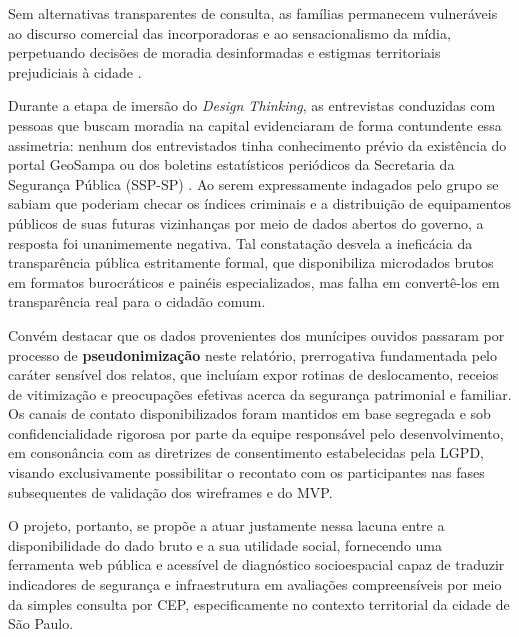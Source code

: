 \documentclass[
    12pt,
    oneside,            %
    a4paper,
    brazilian
    ]{abntex2}
\begin{document}
Sem alternativas transparentes de consulta, as famílias permanecem vulneráveis ao discurso comercial das incorporadoras e ao sensacionalismo da mídia, perpetuando decisões de moradia desinformadas e estigmas territoriais prejudiciais à cidade \cite{nev2024}.

Durante a etapa de imersão do \emph{Design Thinking}, as entrevistas conduzidas com pessoas que buscam moradia na capital evidenciaram de forma contundente essa assimetria: nenhum dos entrevistados tinha conhecimento prévio da existência do portal GeoSampa ou dos boletins estatísticos periódicos da Secretaria da Segurança Pública (SSP-SP) \cite{ssp2024,geosampa2024}. Ao serem expressamente indagados pelo grupo se sabiam que poderiam checar os índices criminais e a distribuição de equipamentos públicos de suas futuras vizinhanças por meio de dados abertos do governo, a resposta foi unanimemente negativa. Tal constatação desvela a ineficácia da transparência pública estritamente formal, que disponibiliza microdados brutos em formatos burocráticos e painéis especializados, mas falha em convertê-los em transparência real para o cidadão comum.

Convém destacar que os dados provenientes dos munícipes ouvidos passaram por processo de \textbf{pseudonimização} neste relatório, prerrogativa fundamentada pelo caráter sensível dos relatos, que incluíam expor rotinas de deslocamento, receios de vitimização e preocupações efetivas acerca da segurança patrimonial e familiar. Os canais de contato disponibilizados foram mantidos em base segregada e sob confidencialidade rigorosa por parte da equipe responsável pelo desenvolvimento, em consonância com as diretrizes de consentimento estabelecidas pela LGPD, visando exclusivamente possibilitar o recontato com os participantes nas fases subsequentes de validação dos wireframes e do MVP.

O projeto, portanto, se propõe a atuar justamente nessa lacuna entre a disponibilidade do dado bruto e a sua utilidade social, fornecendo uma ferramenta web pública e acessível de diagnóstico socioespacial capaz de traduzir indicadores de segurança e infraestrutura em avaliações compreensíveis por meio da simples consulta por CEP, especificamente no contexto territorial da cidade de São Paulo.

\hfill
\end{document}
